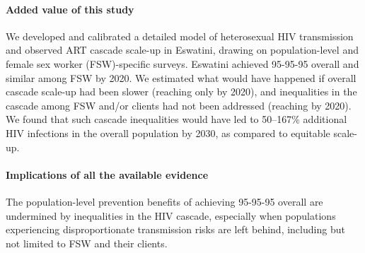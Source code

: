 \begin{ric}
  \paragraph{Added value of this study}
  We developed and calibrated a detailed model of heterosexual HIV transmission
  and observed ART cascade scale-up in Eswatini,
  drawing on population-level and female sex worker (FSW)-specific surveys.
  Eswatini achieved 95-95-95 overall and similar among FSW by 2020.
  We estimated what would have happened if
  overall cascade scale-up had been slower
  (reaching only \casmd by 2020), and
  inequalities in the cascade among FSW and/or clients had not been addressed
  (reaching \caslo by 2020).
  We found that such cascade inequalities
  would have led to 50--167\% additional HIV infections in the overall population by 2030,
  as compared to equitable scale-up.
  \paragraph{Implications of all the available evidence}
  The population-level prevention benefits of achieving 95-95-95 overall
  are undermined by inequalities in the HIV cascade, especially when
  populations experiencing disproportionate transmission risks are left behind,
  including but not limited to FSW and their clients.
\end{ric}
